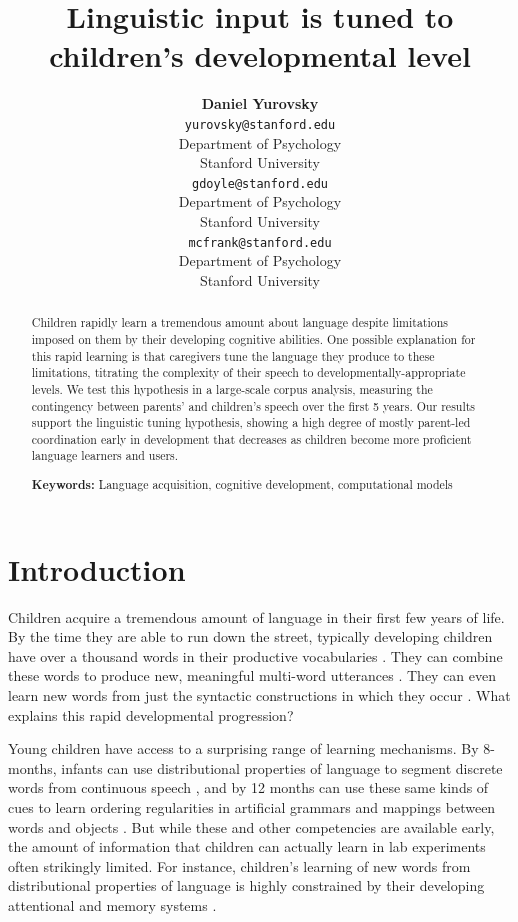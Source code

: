 \documentclass[10pt,letterpaper]{article}
\title{Linguistic input is tuned to children's developmental level}
\author{{\large \bf Daniel Yurovsky} \\ \texttt{yurovsky@stanford.edu}\\ Department of Psychology \\ Stanford University
 	\And {\large \bf Gabriel Doyle} \\ \texttt{gdoyle@stanford.edu} \\ Department of Psychology \\ Stanford University
	\And {\large \bf Michael C. Frank} \\ \texttt{mcfrank@stanford.edu} \\ Department of Psychology \\ Stanford University}
\begin{document}
\maketitle

\begin{abstract}

\vspace{-6 pt}Children rapidly learn a tremendous amount about language despite limitations imposed on them by their developing cognitive abilities. One possible explanation for this rapid learning is that caregivers tune the language they produce to these limitations, titrating the complexity of their speech to developmentally-appropriate levels. We test this hypothesis in a large-scale corpus analysis, measuring the contingency between parents' and children's speech over the first 5 years. Our results support the linguistic tuning hypothesis, showing a high degree of mostly parent-led coordination early in development that decreases as children become more proficient language learners and users.

\textbf{Keywords:}
Language acquisition, cognitive development, computational models
\end{abstract}

\section{Introduction}

Children acquire a tremendous amount of language in their first few years of life. By the time they are able to run down the street, typically developing children have over a thousand words in their productive vocabularies \cite{mayor2011}. They can combine these words to produce new, meaningful multi-word utterances \cite{lieven2009}. They can even learn new words from just the syntactic constructions in which they occur \cite{yuan2009}. What explains this rapid developmental progression?

Young children have access to a surprising range of learning mechanisms. By 8-months, infants can use distributional properties of language to segment discrete words from continuous speech \cite{saffran1996}, and by 12 months can use these same kinds of cues to learn ordering regularities in artificial grammars \cite{gomez1999} and mappings between words and objects \cite{smith2008}. But while these and other competencies are available early, the amount of information that children can actually learn in lab experiments often strikingly limited. For instance, children's learning of new words from distributional properties of language is highly constrained by their developing attentional and memory systems \cite{vlach2013}.
\end{document}
